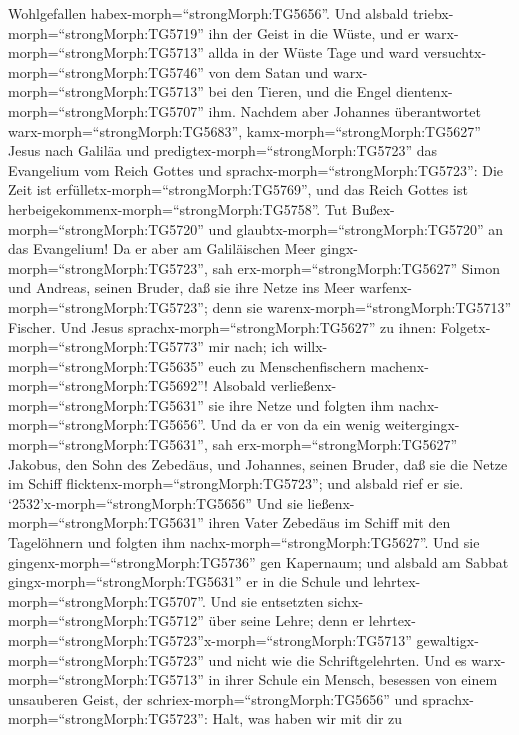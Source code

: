 Wohlgefallen habex-morph=``strongMorph:TG5656''.  Und
alsbald triebx-morph=``strongMorph:TG5719'' ihn der Geist in die Wüste,
 und er warx-morph=``strongMorph:TG5713'' allda in der
Wüste Tage und ward versuchtx-morph=``strongMorph:TG5746'' von dem Satan
und warx-morph=``strongMorph:TG5713'' bei den Tieren, und die Engel
dientenx-morph=``strongMorph:TG5707'' ihm.  Nachdem aber
Johannes überantwortet warx-morph=``strongMorph:TG5683'',
kamx-morph=``strongMorph:TG5627'' Jesus nach Galiläa und
predigtex-morph=``strongMorph:TG5723'' das Evangelium vom Reich Gottes
 und sprachx-morph=``strongMorph:TG5723'': Die Zeit ist
erfülletx-morph=``strongMorph:TG5769'', und das Reich Gottes ist
herbeigekommenx-morph=``strongMorph:TG5758''. Tut
Bußex-morph=``strongMorph:TG5720'' und
glaubtx-morph=``strongMorph:TG5720'' an das Evangelium!  Da
er aber am Galiläischen Meer gingx-morph=``strongMorph:TG5723'', sah
erx-morph=``strongMorph:TG5627'' Simon und Andreas, seinen Bruder, daß
sie ihre Netze ins Meer warfenx-morph=``strongMorph:TG5723''; denn sie
warenx-morph=``strongMorph:TG5713'' Fischer.  Und Jesus
sprachx-morph=``strongMorph:TG5627'' zu ihnen:
Folgetx-morph=``strongMorph:TG5773'' mir nach; ich
willx-morph=``strongMorph:TG5635'' euch zu Menschenfischern
machenx-morph=``strongMorph:TG5692''!  Alsobald
verließenx-morph=``strongMorph:TG5631'' sie ihre Netze und folgten ihm
nachx-morph=``strongMorph:TG5656''.  Und da er von da ein
wenig weitergingx-morph=``strongMorph:TG5631'', sah
erx-morph=``strongMorph:TG5627'' Jakobus, den Sohn des Zebedäus, und
Johannes, seinen Bruder, daß sie die Netze im Schiff
flicktenx-morph=``strongMorph:TG5723''; und alsbald rief er sie.
 `2532'x-morph=``strongMorph:TG5656'' Und sie
ließenx-morph=``strongMorph:TG5631'' ihren Vater Zebedäus im Schiff mit
den Tagelöhnern und folgten ihm nachx-morph=``strongMorph:TG5627''.
 Und sie gingenx-morph=``strongMorph:TG5736'' gen
Kapernaum; und alsbald am Sabbat gingx-morph=``strongMorph:TG5631'' er
in die Schule und lehrtex-morph=``strongMorph:TG5707''. 
Und sie entsetzten sichx-morph=``strongMorph:TG5712'' über seine Lehre;
denn er
lehrtex-morph=``strongMorph:TG5723''x-morph=``strongMorph:TG5713''
gewaltigx-morph=``strongMorph:TG5723'' und nicht wie die
Schriftgelehrten.  Und es warx-morph=``strongMorph:TG5713''
in ihrer Schule ein Mensch, besessen von einem unsauberen Geist, der
schriex-morph=``strongMorph:TG5656''  und
sprachx-morph=``strongMorph:TG5723'': Halt, was haben wir mit dir zu
